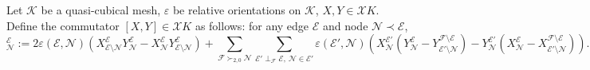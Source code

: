 \begin{definition}
  Let $\mathcal{K}$ be a quasi-cubical mesh,
    $\varepsilon$ be relative orientations on $\mathcal{K}$,
    $X, Y \in \mathcal{X} K$.
  Define the commutator $[X, Y] \in \mathcal{X} K$ as follows:
  for any edge $\mathcal{E}$ and node $\mathcal{N} \prec \mathcal{E}$,
  \begin{equation}
    [X, Y]^{\mathcal{E}}_{\mathcal{N}}
    := 2 \varepsilon(\mathcal{E}, \mathcal{N})
      (   X^{\mathcal{E}}_{\mathcal{E} \setminus \mathcal{N}}
          Y^{\mathcal{E}}_{\mathcal{N}}
        - X^{\mathcal{E}}_{\mathcal{N}}
          Y^{\mathcal{E}}_{\mathcal{E} \setminus \mathcal{N}}
      )
      + \sum_{\mathcal{F} \succ_{2, 0} \mathcal{N}}
        \sum_{\mathcal{E}' \perp_{\mathcal{F}} \mathcal{E},\
              \mathcal{N} \in \mathcal{E}'}
        \varepsilon(\mathcal{E}', \mathcal{N})
        ( X^{\mathcal{E}'}_{\mathcal{N}}
          (Y^{\mathcal{E}}_{\mathcal{N}}
           - Y^{\mathcal{F} \setminus \mathcal{E}}
            _{\mathcal{E}' \setminus \mathcal{N}})
          -
          Y^{\mathcal{E}'}_{\mathcal{N}}
          (X^{\mathcal{E}}_{\mathcal{N}}
           - X^{\mathcal{F} \setminus \mathcal{E}}
            _{\mathcal{E}' \setminus \mathcal{N}})
        ).
  \end{equation}
\end{definition}
